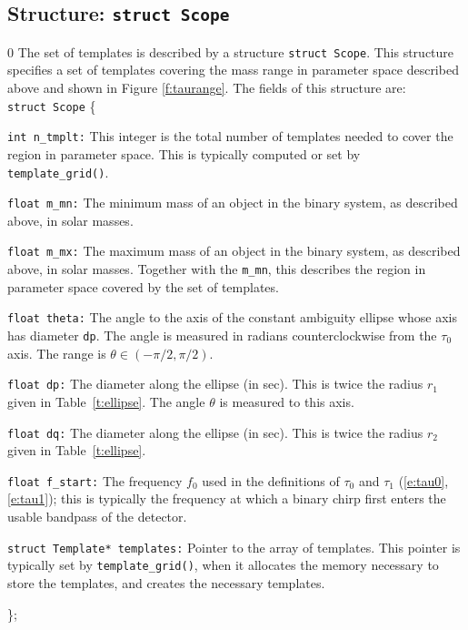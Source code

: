 \subsection{Structure: {\tt struct Scope}}
\setcounter{equation}0
The set of templates is described by a structure {\tt struct Scope}.
This structure specifies a set of templates covering the mass range in
parameter space described above and shown in Figure \ref{f:taurange}.
The fields of this structure are:\\
\noindent
{\tt struct Scope} \{
\begin{description}
\item{\tt int n\_tmplt:}
    This integer is the total number of templates needed to cover the
    region in parameter space.  This is typically computed or set by
    {\tt template\_grid()}.
\item{\tt float m\_mn:}
   The minimum mass of an object in the binary system, as described above, in solar masses.
\item{\tt float m\_mx:}
   The maximum mass of an object in the binary system, as described
   above, in solar masses.  Together with the {\tt m\_mn}, this
   describes the region in parameter space covered by the set of
   templates.
\item{\tt float theta:}
    The angle to the axis of the constant ambiguity ellipse whose
    axis has diameter {\tt dp}. The angle is measured in radians
    counterclockwise from the $\tau_0$ axis.  The range is $\theta \in
    (-\pi/2,\pi/2)$.
\item{\tt float dp:}
   The diameter along the ellipse (in sec).  This is
   twice the radius $r_1$ given in Table~\ref{t:ellipse}.
   The angle $\theta$ is measured to this axis.
\item{\tt float dq:}
   The diameter along the ellipse (in sec).  This is
   twice the radius $r_2$ given in Table~\ref{t:ellipse}.
\item{\tt float f\_start:}
   The frequency $f_0$ used in the definitions of $\tau_0$ and $\tau_1$
   (\ref{e:tau0},\ref{e:tau1}); this is typically the frequency at
   which a binary chirp first enters the usable bandpass of the
   detector.
\item{\tt struct Template* templates:}
   Pointer to the array of templates.  This pointer is typically set by
   {\tt template\_grid()}, when it allocates the memory necessary to
   store the templates, and creates the necessary templates.
\end{description}
\};

